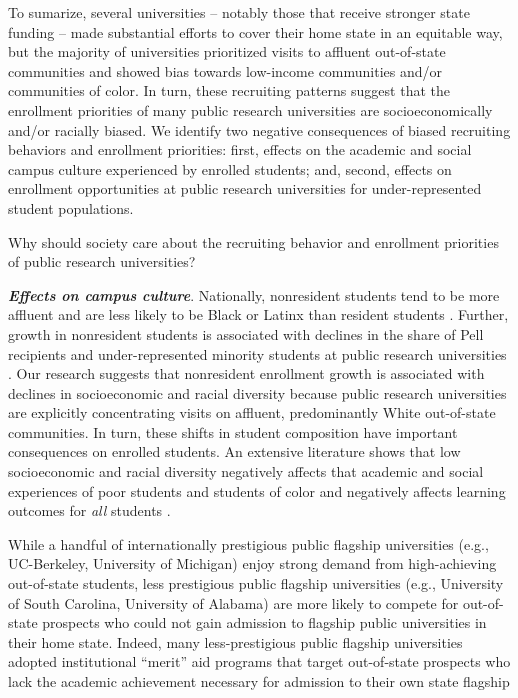 \documentclass[twoside]{article}
\begin{document}
To sumarize, several universities -- notably those that receive stronger state funding -- made substantial efforts to cover their home state in an equitable way, but the majority of universities prioritized visits to affluent out-of-state communities and showed bias towards low-income communities and/or communities of color.  In turn, these recruiting patterns suggest that the enrollment priorities of many public research universities are socioeconomically and/or racially biased.  We identify two negative consequences of biased recruiting behaviors and enrollment priorities: first, effects on the academic and social campus culture experienced by enrolled students; and, second, effects on enrollment opportunities at public research universities for under-represented student populations.

 Why should society care about the recruiting behavior and enrollment priorities of public research universities? 
 

\textbf{\textit{Effects on campus culture}}.  Nationally, nonresident students tend to be more affluent and are less likely to be Black or Latinx than resident students \citep{RN3685}. Further, growth in nonresident students is associated with declines in the share of Pell recipients and under-represented minority students at public research universities \citep{RN3685}.  Our research suggests that nonresident enrollment growth is associated with declines in socioeconomic and racial diversity because public research universities are explicitly concentrating visits on affluent, predominantly White out-of-state communities.  In turn, these shifts in student composition have important consequences on enrolled students.  An extensive literature shows that low socioeconomic and racial diversity negatively affects that academic and social experiences of poor students and students of color \citep[e.g., ][]{RN3205,RN3193,RN3639,RN3185} and negatively affects learning outcomes for \textit{all} students \citep[e.g., ][]{RN3026,RN2576,RN3153,RN3174}.

While a handful of internationally prestigious public flagship universities (e.g., UC-Berkeley, University of Michigan) enjoy strong demand from high-achieving out-of-state students, less prestigious public flagship universities (e.g., University of South Carolina, University of Alabama) are more likely to compete for out-of-state prospects who could not gain admission to flagship public universities in their home state.  Indeed, many less-prestigious public flagship universities adopted institutional ``merit'' aid programs that target out-of-state prospects who lack the academic achievement necessary for admission to their own state flagship \citep{RN1469,RN3762,RN4032,RN4409}
\end{document}
